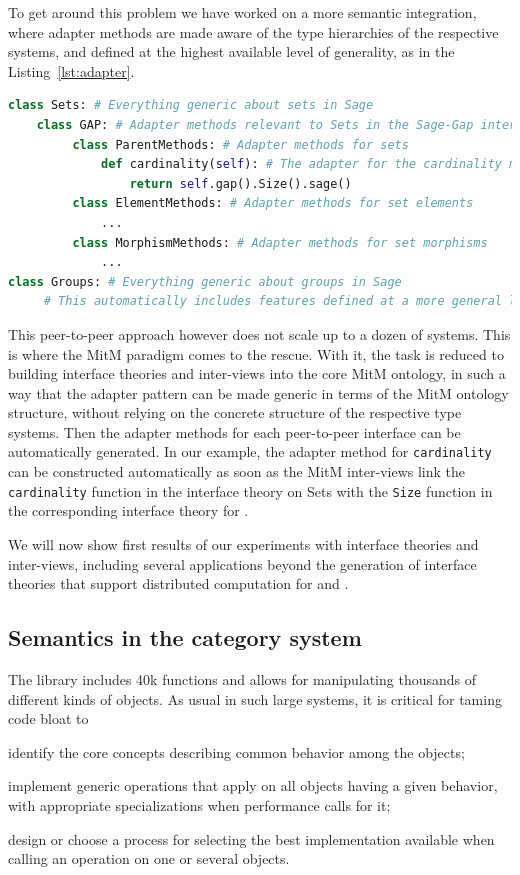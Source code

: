 To get around this problem we have worked on a more semantic
integration, where adapter methods are made aware of the type
hierarchies of the respective systems, and defined at the highest
available level of generality, as in the Listing~\ref{lst:adapter}.
\begin{lstlisting}[language=Python,label=lst:adapter,
  caption=A semantic adapter method in \Sage]
class Sets: # Everything generic about sets in Sage
    class GAP: # Adapter methods relevant to Sets in the Sage-Gap interface
         class ParentMethods: # Adapter methods for sets
             def cardinality(self): # The adapter for the cardinality method
                 return self.gap().Size().sage()
         class ElementMethods: # Adapter methods for set elements
             ...
         class MorphismMethods: # Adapter methods for set morphisms
             ...
class Groups: # Everything generic about groups in Sage
     # This automatically includes features defined at a more general level
\end{lstlisting}

This peer-to-peer approach however does not scale up to a dozen of
systems. This is where the MitM paradigm comes to the rescue. With it,
the task is reduced to building interface theories and inter-views into
the core MitM ontology, in such a way that the adapter pattern can be
made generic in terms of the MitM ontology structure, without relying
on the concrete structure of the respective type systems. Then the
adapter methods for each peer-to-peer interface can be automatically
generated.
%
In our example, the adapter method for \texttt{cardinality} can be
constructed automatically as soon as the MitM inter-views link the
\texttt{cardinality} function in the \Sage interface theory on Sets
with the \texttt{Size} function in the corresponding interface theory
for \GAP.

We will now show first results of our experiments with interface
theories and inter-views, including several applications beyond the
generation of interface theories that support distributed computation
for \Sage and \GAP.

\subsection{Semantics in the \Sage category system}

The \Sage library includes 40k functions and allows for manipulating
thousands of different kinds of objects. As usual in such large
systems, it is critical for taming code bloat to
\begin{compactenum}[\em i\rm)]
\item identify the core concepts describing common behavior among the objects;
\item implement generic operations that apply on all objects having a given
  behavior, with appropriate specializations when performance calls for it;
\item design or choose a process for selecting the best implementation available when
  calling an operation on one or several objects.
\end{compactenum}

